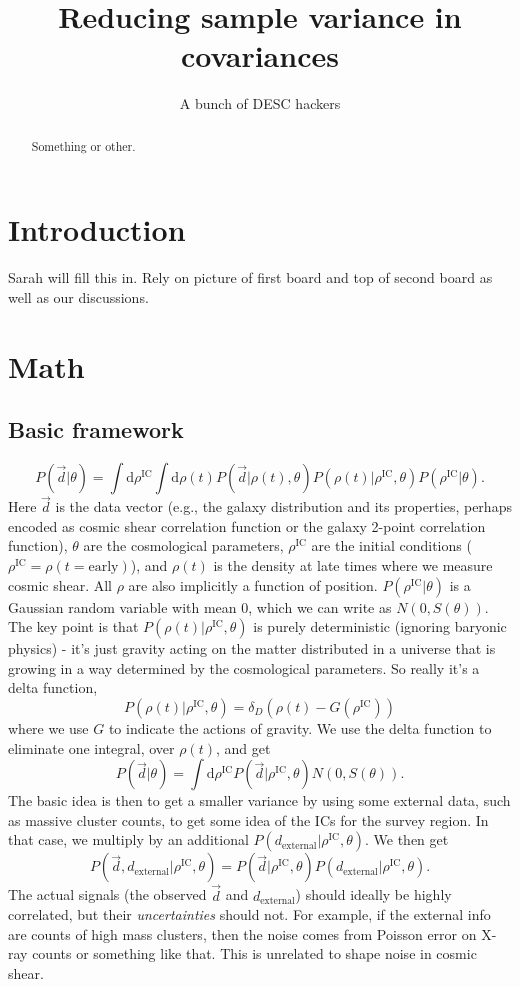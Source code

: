 \documentclass[preprint]{aastex}
\newcommand{\beq}{\begin{equation}}
\newcommand{\eeq}{\end{equation}}
\begin{document}
\title{Reducing sample variance in covariances}

\author{A bunch of DESC hackers}
\begin{abstract}
Something or other.
\end{abstract}

\section{Introduction}

Sarah will fill this in.  Rely on picture of first board and top of second board as well as our discussions.

\section{Math}

\subsection{Basic framework}
\beq
P(\vec{d}|\theta) = \int \mathrm{d}\rho^\text{IC}\int \mathrm{d}\rho(t) P(\vec{d}|\rho(t),\theta)
P(\rho(t)|\rho^\text{IC},\theta) P(\rho^\text{IC}|\theta).
\eeq
Here $\vec{d}$ is the data vector (e.g., the galaxy distribution and its properties, perhaps encoded
as cosmic shear correlation function or the galaxy 2-point
correlation function), $\theta$ are the cosmological parameters, $\rho^\text{IC}$ are the initial
conditions ($\rho^\text{IC}=\rho(t=\text{early})$), and $\rho(t)$ is the density at late times where we measure cosmic
shear.  All $\rho$ are also implicitly a function of position.
$P(\rho^\text{IC}|\theta)$ is a Gaussian random variable with mean $0$, which we can write as $N(0,S(\theta))$.  The key point is that
$P(\rho(t)|\rho^\text{IC},\theta)$ is purely deterministic (ignoring baryonic physics) - it's just
gravity acting on the matter distributed in a universe that is growing in a way determined by the
cosmological parameters.  So really it's a delta function,
\beq
P(\rho(t)|\rho^\text{IC},\theta) = \delta_D(\rho(t)-G(\rho^\text{IC}))
\eeq 
where we use $G$ to indicate the actions of gravity.  We use the delta function to eliminate one
integral, over $\rho(t)$, and get
\beq
P(\vec{d}|\theta) = \int \mathrm{d}\rho^\text{IC}  P(\vec{d}|\rho^\text{IC},\theta)N(0,S(\theta)).
\eeq
The basic idea is then to get a smaller variance by using some external data, such as massive
cluster counts, to get some idea of the ICs for the survey region.  In that case, we multiply by an
additional $P(d_\text{external}|\rho^\text{IC},\theta)$.  We then get
\beq
P(\vec{d},d_\text{external}|\rho^\text{IC},\theta) = P(\vec{d}|\rho^\text{IC},\theta)P(d_\text{external}|\rho^\text{IC},\theta).
\eeq
The actual signals (the observed $\vec{d}$ and $d_\text{external}$) should ideally be highly
correlated, but their {\em uncertainties} should not.  For example, if the external info are counts
of high mass clusters, then the noise comes from Poisson error on X-ray counts or something like
that.  This is unrelated to shape noise in cosmic shear.
\end{document}
